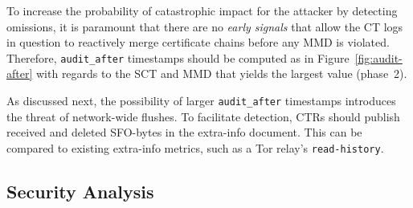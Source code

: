 To increase the probability of catastrophic impact for the attacker by detecting
omissions, it is paramount that there are no \emph{early signals} that
allow the CT logs in question to reactively merge certificate chains before
any MMD is violated.  Therefore, \texttt{audit\_after} timestamps should be
computed as in Figure~\ref{fig:audit-after} with regards to the SCT and MMD that
yields the largest value (phase~2).

%
%

As discussed next, the possibility of larger \texttt{audit\_after} timestamps
introduces the threat of network-wide flushes.  To facilitate detection, CTRs
should publish received and deleted SFO-bytes in the extra-info document.  This
can be compared to existing extra-info metrics, such as a Tor relay's
\texttt{read-history}.

\subsection{Security Analysis}
